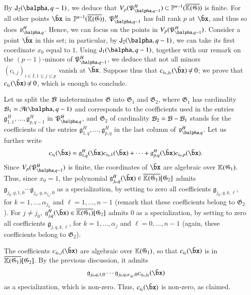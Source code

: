 \documentclass[amsthm]{elsart}
\begin{document}
By $\assI_2(\balpha,q-1)$, we deduce that
$V_p(\mathfrak{P}^H_{\balpha,q-1}) \subset \P^{n-1}(\KKCbar)$ is
finite. For all other points $\tilde\bx$ in $\mathbb{P}^{n-1}(\overline{\mathbb{K}(\mathfrak{G})})$,
$\mathfrak{P}^H_{\balpha,q-1}$ has full rank $p$ at $\tilde\bx$, and
thus so does $\mathfrak{p}^H_{\balpha,q}$. Hence, we can focus on the
points in $V_p(\mathfrak{P}^H_{\balpha,q-1})$.  Consider a point
$\tilde\bx$ in this set; in particular, by $\assI_2(\balpha,q-1)$, we
can take its first coordinate $x_0$ equal to $1$. Using
$\assI_1(\balpha,q-1)$, together with our remark on the $(p-1)$-minors
of $\mathfrak{P}^H_{\balpha,q-1}$, we deduce that not all minors
$(c_{i,j})_{i \in I, 1 \le j \le p}$ vanish at $\tilde\bx$. Suppose
thus that $c_{i_0,j_0}(\tilde\bx) \ne 0$; we prove that
$c_{i_0}(\tilde\bx) \ne 0$, which is enough to conclude.

Let us split the ${\cal B}$ indeterminates $\mathfrak{G}$ into
$\mathfrak{G}_1$ and $\mathfrak{G}_2$, where $\mathfrak{G}_1$ has
cardinality ${\cal B}_1={\cal A}(\balpha,q-1)$ and corresponds to the coefficients
used in the entries
$\mathfrak{g}^H_{1,1},\dots,\mathfrak{g}^H_{p,q-1}$ in
$\mathfrak{P}^H_{\balpha,q}$, and $\mathfrak{G}_2$ of cardinality
${\cal B}_2={\cal B}-{\cal B}_1$ stands for the coefficients of the entries
$\mathfrak{g}^H_{1,q},\dots,\mathfrak{g}^H_{p,q}$ in the last column
of $\mathfrak{p}^H_{\balpha,q}$.  Let us further
write $$c_{i_0}(\tilde\bx)= \mathfrak{g}^H_{1,q}(\tilde\bx)
c_{i_0,1}(\tilde\bx) + \cdots + \mathfrak{g}^H_{p,q}(\tilde\bx)
c_{i_0,p}(\tilde\bx).$$ Since $V_p(\mathfrak{P}^H_{\balpha,q-1})$ is
finite, the coordinates of $\tilde\bx$ are algebraic over
$\mathbb{K}(\mathfrak{G}_1)$.  Thus, since $x_0=1$, the polynomial
$\mathfrak{g}^H_{j_0,q}(\tilde\bx)\in
\overline{\KK(\mathfrak{G}_1)}[\mathfrak{G}_2]$ admits
$\mathfrak{g}_{j_0,q,1,0}\cdots \mathfrak{g}_{j_0,q,\alpha_{j_0},0}$ as a
specialization, by setting to zero all coefficients
$\mathfrak{g}_{j_0,q,k,\ell}$, for $k=1,\dots,\alpha_{j_0}$ and
$\ell=1,\dots,n-1$ (remark that these coefficients belong to $\mathfrak{G}_2$).  For $j \ne
j_0$, $\mathfrak{g}^H_{j,q}(\tilde\bx)\in
\overline{\KK(\mathfrak{G}_1)}[\mathfrak{G}_2]$ admits $0$ as a
specialization, by setting to zero all coefficients
$\mathfrak{g}_{j,q,k,\ell}$, for $k=1,\dots,\alpha_j$ and
$\ell=0,\dots,n-1$ (again, these coefficients belong to $\mathfrak{G}_2$).

The coefficients $c_{i_0,j}(\tilde\bx)$ are algebraic over
$\mathbb{K}(\mathfrak{G}_1)$, so that $c_{i_0}(\tilde\bx)$ is in
$\overline{\mathbb{K}(\mathfrak{G}_1)}[\mathfrak{G}_2]$. By the previous 
discussion, it admits
$$ \mathfrak{g}_{j_0,q,1,0}\cdots \mathfrak{g}_{j_0,q,\alpha_{j_0},0} c_{i_0,j_0}(\tilde\bx)$$ as a
specialization, which is non-zero. Thus,  $c_{i_0}(\tilde\bx)$ 
is non-zero, as claimed.
\end{document}
